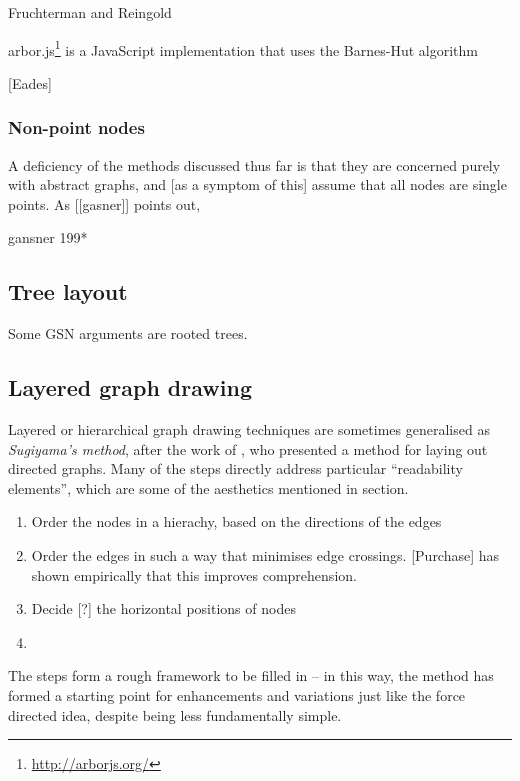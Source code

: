 Fruchterman and Reingold 

arbor.js\footnote{\url{http://arborjs.org/}} is a JavaScript implementation that uses the Barnes-Hut algorithm 

[Eades]

\citet{handbook:forcedir}

\subsubsection{Non-point nodes}

A deficiency of the methods discussed thus far is that they are concerned purely with abstract graphs, and [as a symptom of this] assume that all nodes are single points. As [[gasner]] points out, 


gansner 199*




\subsection{Tree layout}

Some GSN arguments are rooted trees. 



\subsection{Layered graph drawing}

Layered or hierarchical graph drawing techniques are sometimes generalised as \emph{Sugiyama's method}, after the work of \citet{4308636}, who presented a method for laying out directed graphs. Many of the steps directly address particular ``readability elements'', which are some of the aesthetics mentioned in section.

\begin{enumerate}
\item Order the nodes in a hierachy, based on the directions of the edges
\item Order the edges in such a way that minimises edge crossings. [Purchase] has shown empirically that this improves comprehension.
\item Decide [?] the horizontal positions of nodes
\item
\end{enumerate}

The steps form a rough framework to be filled in -- in this way, the method has formed a starting point for enhancements and variations just like the force directed idea, despite being less fundamentally simple.

